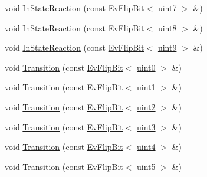 \begin{DoxyCompactItemize}
\item 
void \mbox{\hyperlink{struct_bit_machine_a141e630cf0be7c330a5ef019cbdb5cf5}{In\+State\+Reaction}} (const \mbox{\hyperlink{struct_ev_flip_bit}{Ev\+Flip\+Bit}}$<$ \mbox{\hyperlink{_performance_8cpp_ae332b751ff9ebef63d125fdaaaf45f8c}{uint7}} $>$ \&)
\item 
void \mbox{\hyperlink{struct_bit_machine_a3a793d4f5cda90bcd4fee1acf553a1b1}{In\+State\+Reaction}} (const \mbox{\hyperlink{struct_ev_flip_bit}{Ev\+Flip\+Bit}}$<$ \mbox{\hyperlink{_performance_8cpp_acf7191ac01fae99fae3f5a89e4f8a8ff}{uint8}} $>$ \&)
\item 
void \mbox{\hyperlink{struct_bit_machine_af8868edd3c7e77b3630278c1fd47247c}{In\+State\+Reaction}} (const \mbox{\hyperlink{struct_ev_flip_bit}{Ev\+Flip\+Bit}}$<$ \mbox{\hyperlink{_performance_8cpp_ac1d5f5aee5a76e77d960741a1bd84b12}{uint9}} $>$ \&)
\item 
void \mbox{\hyperlink{struct_bit_machine_a43a10ef23aab14065277c1bc34d08007}{Transition}} (const \mbox{\hyperlink{struct_ev_flip_bit}{Ev\+Flip\+Bit}}$<$ \mbox{\hyperlink{_performance_8cpp_ac4323a4a68daf3126a7be25628f1d622}{uint0}} $>$ \&)
\item 
void \mbox{\hyperlink{struct_bit_machine_a75b74e2bcb9417cad75dabe92e4663fc}{Transition}} (const \mbox{\hyperlink{struct_ev_flip_bit}{Ev\+Flip\+Bit}}$<$ \mbox{\hyperlink{_performance_8cpp_afada4030cdd8c9628ca412e4409d07d1}{uint1}} $>$ \&)
\item 
void \mbox{\hyperlink{struct_bit_machine_a0eef1a8ac436d26db1920032bc81186b}{Transition}} (const \mbox{\hyperlink{struct_ev_flip_bit}{Ev\+Flip\+Bit}}$<$ \mbox{\hyperlink{_performance_8cpp_ad7cf25dde7cbe398d57ed74b7109aaaa}{uint2}} $>$ \&)
\item 
void \mbox{\hyperlink{struct_bit_machine_a065addd94fcc6c7046e700da2d170370}{Transition}} (const \mbox{\hyperlink{struct_ev_flip_bit}{Ev\+Flip\+Bit}}$<$ \mbox{\hyperlink{_performance_8cpp_a487e33775f12c3ab023e66546a69810f}{uint3}} $>$ \&)
\item 
void \mbox{\hyperlink{struct_bit_machine_a7a095e344792b70a069ee44fbd6f2e3a}{Transition}} (const \mbox{\hyperlink{struct_ev_flip_bit}{Ev\+Flip\+Bit}}$<$ \mbox{\hyperlink{_performance_8cpp_aa143aaac7fcfe524f6f4f33cc878ae95}{uint4}} $>$ \&)
\item 
void \mbox{\hyperlink{struct_bit_machine_a6ae4632116970d2f52185f71e086c37d}{Transition}} (const \mbox{\hyperlink{struct_ev_flip_bit}{Ev\+Flip\+Bit}}$<$ \mbox{\hyperlink{_performance_8cpp_a34732dbaa46d46251e4ac1faef9fcecd}{uint5}} $>$ \&)
\item 

\end{DoxyCompactItemize}
